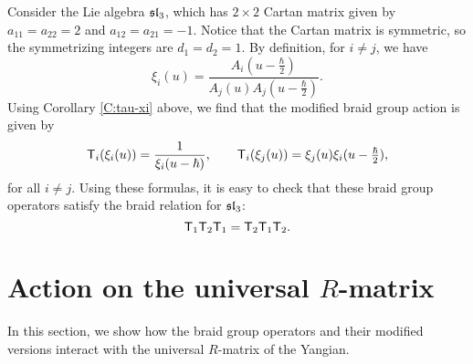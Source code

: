 \begin{example}\label{E:sl3-mbraid-action}
    Consider the Lie algebra $\mathfrak{sl}_3$, which has $2\times 2$ Cartan matrix given by $a_{11}=a_{22}=2$ and $a_{12}=a_{21}=-1$.
    Notice that the Cartan matrix is symmetric, so the symmetrizing integers are $d_1=d_2=1$.
    By definition, for $i\neq j$, we have
    \[\xi_i(u) = \frac{A_i(u-\frac{\hbar}{2})}{A_j(u)A_j(u-\frac{\hbar}{2})}.\]
    Using Corollary \ref{C:tau-xi} above, we find that the modified braid group action is given by
    \[\mathsf{T}_i(\xi_i(u)) = \frac{1}{\xi_i(u-\hbar)}, \qquad
    \mathsf{T}_i(\xi_j(u)) = \xi_j(u)\xi_i(u-\tfrac{\hbar}{2}),\]
    for all $i\neq j$.
    Using these formulas, it is easy to check that these braid group operators satisfy the braid relation for $\mathfrak{sl}_3$:
    \[\mathsf{T}_1\mathsf{T}_2\mathsf{T}_1 = \mathsf{T}_2\mathsf{T}_1\mathsf{T}_2.\]
\end{example}


\section{Action on the universal \texorpdfstring{$R$}{R}-matrix}

In this section, we show how the braid group operators and their modified versions interact with the universal $R$-matrix of the Yangian.
